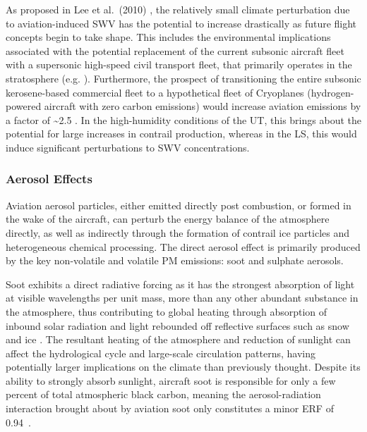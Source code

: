 As proposed in Lee et al.\ (2010) \cite{Lee2010}, the relatively small climate perturbation due to aviation-induced SWV has the potential to increase drastically as future flight concepts begin to take shape. This includes the environmental implications associated with the potential replacement of the current subsonic aircraft fleet with a supersonic high-speed civil transport fleet, that primarily operates in the stratosphere (e.g. \cite{MiakeLye1993, Danilin1994, Grooss1998, Kawa1999}). Furthermore, the prospect of transitioning the entire subsonic kerosene-based commercial fleet to a hypothetical fleet of Cryoplanes (hydrogen-powered aircraft with zero carbon emissions) would increase aviation  emissions by a factor of \textasciitilde2.5 \cite{Gauss2003}. In the high-humidity conditions of the UT, this brings about the potential for large increases in contrail production, whereas in the LS, this would induce significant perturbations to SWV concentrations.


\subsubsection{Aerosol Effects}
Aviation aerosol particles, either emitted directly post combustion, or formed in the wake of the aircraft, can perturb the energy balance of the atmosphere directly, as well as indirectly through the formation of contrail ice particles and heterogeneous chemical processing. The direct aerosol effect is primarily produced by the key non-volatile and volatile PM emissions: soot and sulphate aerosols.

Soot exhibits a direct radiative forcing as it has the strongest absorption of light at visible wavelengths per unit mass, more than any other abundant substance in the atmosphere, thus contributing to global heating through absorption of inbound solar radiation and light rebounded off reflective surfaces such as snow and ice \cite{Bond2013}. The resultant heating of the atmosphere and reduction of sunlight can affect the hydrological cycle and large-scale circulation patterns, having potentially larger implications on the climate than previously thought. Despite its ability to strongly absorb sunlight, aircraft soot is responsible for only a few percent of total atmospheric black carbon, meaning the aerosol-radiation interaction brought about by aviation soot only constitutes a minor ERF of 0.94~.

